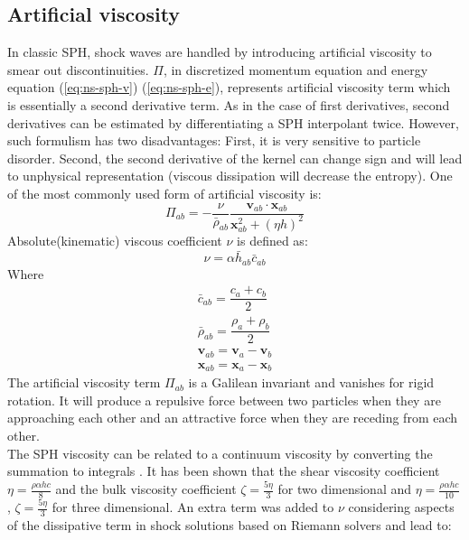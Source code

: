 \documentclass[10pt,a4paper]{article}
\begin{document}
\subsection{Artificial viscosity} \label{sec:artificial-viscosity}
In classic SPH, shock waves are handled by introducing artificial viscosity to smear out discontinuities. $\Pi$, in discretized momentum equation and energy equation (\ref{eq:ns-sph-v}) (\ref{eq:ns-sph-e}), represents artificial viscosity term which is essentially a second derivative term. As in the case of first derivatives, second derivatives can be estimated by differentiating a SPH interpolant twice. However, such formulism has two disadvantages: First, it is very sensitive to particle disorder. Second, the second derivative of the kernel can change sign and will lead to unphysical representation (viscous dissipation will decrease the entropy). 
One of the most commonly used form of artificial viscosity is:
\begin{equation}
\Pi_{ab}=- \frac{\nu}{\bar{\rho}_{ab}} \dfrac{ \textbf{v}_{ab} \cdot \textbf{x}_{ab}}{\textbf{x}_{ab}^2 + (\eta h)^2}
\label{eq:art-vis-original}
\end{equation}
Absolute(kinematic) viscous coefficient $\nu$ is defined as:
\begin{equation}
\nu = \alpha \bar{h}_{ab} \bar{c}_{ab}
\end{equation}
Where 
\begin{eqnarray}
\bar{c}_{ab} = \dfrac{c_a + c_b}{2} \\
\bar{\rho}_{ab} = \dfrac{\rho_a + \rho_b}{2} \\
\textbf{v}_{ab}=\textbf{v}_a-\textbf{v}_b \\
\textbf{x}_{ab}=\textbf{x}_a-\textbf{x}_b
\end{eqnarray}
The artificial viscosity term $\Pi_{ab}$ is a Galilean invariant and vanishes for rigid rotation. It will produce a repulsive force between two particles when they are approaching each other and an attractive force when they are receding from each other. \\
The SPH viscosity can be related to a continuum viscosity by converting the summation to integrals \citep{monaghan2005smoothed}. It has been shown that the shear viscosity coefficient $\eta = \frac{\rho \alpha h c}{8} $ and the bulk viscosity coefficient $ \zeta = \frac{5 \eta}{3}$ for two dimensional and $\eta = \frac{\rho \alpha h c}{10} $ , $ \zeta = \frac{5 \eta}{3}$ for three dimensional.
An extra term was added to $\nu$ considering aspects of the dissipative term in shock solutions based on Riemann solvers and lead to:
\end{document}

